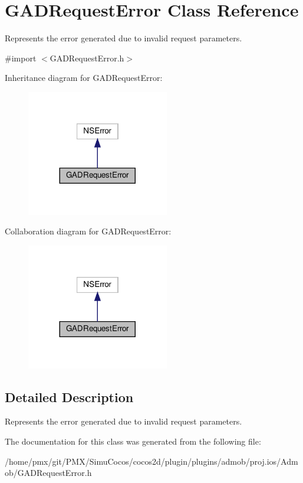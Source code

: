 \hypertarget{interfaceGADRequestError}{}\section{G\+A\+D\+Request\+Error Class Reference}
\label{interfaceGADRequestError}


Represents the error generated due to invalid request parameters.  




{\ttfamily \#import $<$G\+A\+D\+Request\+Error.\+h$>$}



Inheritance diagram for G\+A\+D\+Request\+Error\+:
\nopagebreak
\begin{figure}[H]
\begin{center}
\leavevmode
\includegraphics[width=176pt]{interfaceGADRequestError__inherit__graph}
\end{center}
\end{figure}


Collaboration diagram for G\+A\+D\+Request\+Error\+:
\nopagebreak
\begin{figure}[H]
\begin{center}
\leavevmode
\includegraphics[width=176pt]{interfaceGADRequestError__coll__graph}
\end{center}
\end{figure}


\subsection{Detailed Description}
Represents the error generated due to invalid request parameters. 

The documentation for this class was generated from the following file\+:\begin{DoxyCompactItemize}
\item 
/home/pmx/git/\+P\+M\+X/\+Simu\+Cocos/cocos2d/plugin/plugins/admob/proj.\+ios/\+Admob/G\+A\+D\+Request\+Error.\+h\end{DoxyCompactItemize}
